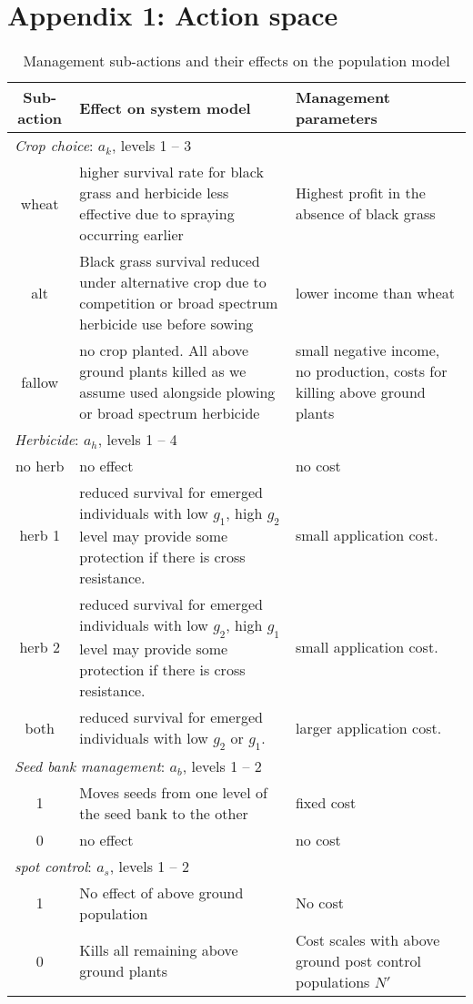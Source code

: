 \documentclass[12pt, a4paper]{article}
\begin{document}
\section*{Appendix 1: Action space}
\begin{longtable}[h]{c p{9cm} p{4cm}}
\caption{Management sub-actions and their effects on the population model\label{table:actions}}\\
	\hline
	\textbf{Sub-action} & \textbf{Effect on system model} & \textbf{Management parameters}\\
	\hline	
	\multicolumn{3}{l}{\textit{Crop choice}: $a_k$, levels 1 -- 3}\\
	wheat & higher survival rate for black grass and herbicide less effective due to spraying occurring earlier & Highest profit in the absence of black grass \\
	alt & Black grass survival reduced under alternative crop due to competition or broad spectrum herbicide use before sowing & lower income than wheat\\
	fallow & no crop planted. All above ground plants killed as we assume used alongside plowing or broad spectrum herbicide & small negative income, no production, costs for killing above ground plants\\
	\multicolumn{3}{l}{\textit{Herbicide}: $a_h$, levels 1 -- 4}\\
	no herb & no effect & no cost\\ 
	herb 1 & reduced survival for emerged individuals with low $g_1$, high $g_2$ level may provide some protection if there is cross resistance. & small application cost.\\
	herb 2 & reduced survival for emerged individuals with low $g_2$, high $g_1$ level may provide some protection if there is cross resistance. & small application cost.\\  
	both & reduced survival for emerged individuals with low $g_2$ or $g_1$. & larger application cost.\\  
	\multicolumn{3}{l}{\textit{Seed bank management}: $a_b$, levels 1 -- 2}\\
	1 & Moves seeds from one level of the seed bank to the other & fixed cost\\
	0 & no effect & no cost\\
	\multicolumn{3}{l}{\textit{spot control}: $a_s$, levels 1 -- 2}\\
	1 & No effect of above ground population & No cost\\
	0 & Kills all remaining above ground plants & Cost scales with above ground post control populations $N'$ \\
	\hline
\end{longtable}
\end{document}
